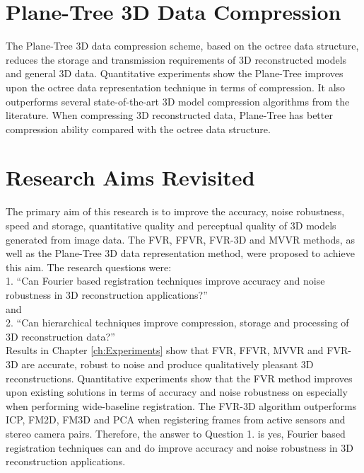 \section{Plane-Tree 3D Data Compression}
\label{Sec:ConcPT}

The Plane-Tree 3D data compression scheme, based on the octree data structure, reduces the storage and transmission requirements of 3D reconstructed models and general 3D data. Quantitative experiments show the Plane-Tree improves upon the octree data representation technique in terms of compression. It also outperforms several state-of-the-art 3D model compression algorithms from the literature. When compressing 3D reconstructed data, Plane-Tree has better compression ability compared with the octree data structure. \\

\section{Research Aims Revisited}

The primary aim of this research is to improve the accuracy, noise robustness, speed and storage, quantitative quality and perceptual quality of 3D models generated from image data. The FVR, FFVR, FVR-3D and MVVR methods, as well as the Plane-Tree 3D data representation method, were proposed to achieve this aim. The research questions were: \\

1. ``Can Fourier based registration techniques improve accuracy and noise robustness in 3D reconstruction applications?'' \\

and \\

2. ``Can hierarchical techniques improve compression, storage and processing of 3D reconstruction data?'' \\


Results in Chapter \ref{ch:Experiments} show that FVR, FFVR, MVVR and FVR-3D are accurate, robust to noise and produce qualitatively pleasant 3D reconstructions. Quantitative experiments show that the FVR method improves upon existing solutions in terms of accuracy and noise robustness on especially when performing wide-baseline registration. The FVR-3D algorithm outperforms ICP, FM2D, FM3D and PCA when registering frames from active sensors and stereo camera pairs. Therefore, the answer to Question 1. is yes, Fourier based registration techniques can and do improve accuracy and noise robustness in 3D reconstruction applications. \\


